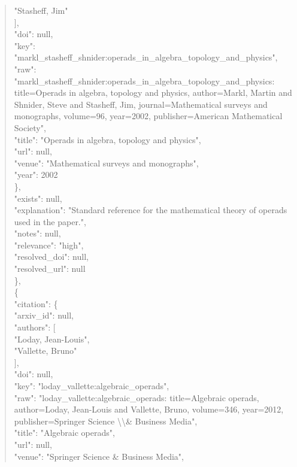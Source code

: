 \documentclass[11pt]{article}
\begin{document}
\begin{quote}
          "Stasheff, Jim"\\
        ],\\
        "doi": null,\\
        "key": "markl\_stasheff\_shnider:operads\_in\_algebra\_topology\_and\_physics",\\
        "raw": "markl\_stasheff\_shnider:operads\_in\_algebra\_topology\_and\_physics: title=Operads in algebra, topology and physics, author=Markl, Martin and Shnider, Steve and Stasheff, Jim, journal=Mathematical surveys and monographs, volume=96, year=2002, publisher=American Mathematical Society",\\
        "title": "Operads in algebra, topology and physics",\\
        "url": null,\\
        "venue": "Mathematical surveys and monographs",\\
        "year": 2002\\
      \},\\
      "exists": null,\\
      "explanation": "Standard reference for the mathematical theory of operads used in the paper.",\\
      "notes": null,\\
      "relevance": "high",\\
      "resolved\_doi": null,\\
      "resolved\_url": null\\
    \},\\
    \{\\
      "citation": \{\\
        "arxiv\_id": null,\\
        "authors": [\\
          "Loday, Jean-Louis",\\
          "Vallette, Bruno"\\
        ],\\
        "doi": null,\\
        "key": "loday\_vallette:algebraic\_operads",\\
        "raw": "loday\_vallette:algebraic\_operads: title=Algebraic operads, author=Loday, Jean-Louis and Vallette, Bruno, volume=346, year=2012, publisher=Springer Science \textbackslash{}\textbackslash{}\& Business Media",\\
        "title": "Algebraic operads",\\
        "url": null,\\
        "venue": "Springer Science \& Business Media",\\

\end{quote}
\end{document}
